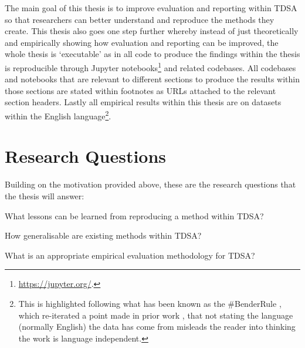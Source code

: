 The main goal of this thesis is to improve evaluation and reporting within TDSA so that researchers can better understand and reproduce the methods they create. This thesis also goes one step further whereby instead of just theoretically and empirically showing how evaluation and reporting can be improved, the whole thesis is `executable' as in all code to produce the findings within the thesis is reproducible through Jupyter notebooks\footnote{\url{https://jupyter.org/}.} and related codebases. All codebases and notebooks that are relevant to different sections to produce the results within those sections are stated within footnotes as URLs attached to the relevant section headers. Lastly all empirical results within this thesis are on datasets within the English language\footnote{This is highlighted following what has been known as the \#BenderRule \citep{bender2019rule}, which re-iterated a point made in prior work \citep{bender2011achieving}, that not stating the language (normally English) the data has come from misleads the reader into thinking the work is language independent.}.


\section{Research Questions}
Building on the motivation provided above, these are the research questions that the thesis will answer:

\begin{researchq}
What lessons can be learned from reproducing a method within TDSA? 
\label{rq:lessons}
\end{researchq}

\begin{researchq}
How generalisable are existing methods within TDSA?
\label{rq:generalisable}
\end{researchq}

\begin{researchq}
What is an appropriate empirical evaluation methodology for TDSA?
\label{rq:measured}
\end{researchq}

